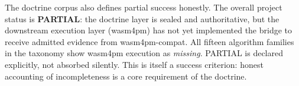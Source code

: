 The doctrine corpus also defines partial success honestly. The overall project status is
\textbf{PARTIAL}: the doctrine layer is sealed and authoritative, but the downstream
execution layer (wasm4pm) has not yet implemented the bridge to receive admitted evidence
from wasm4pm-compat. All fifteen algorithm families in the taxonomy show wasm4pm execution as
\emph{missing}. PARTIAL is declared explicitly, not absorbed silently. This is itself a
success criterion: honest accounting of incompleteness is a core requirement of the doctrine.
